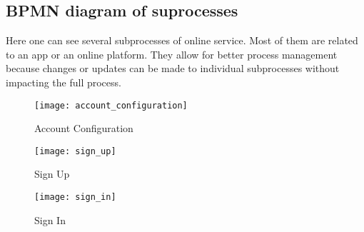 \newpage
\subsection{BPMN diagram of suprocesses}

Here one can see several subprocesses of online service.
Most of them are related to an app or an online platform.
They allow for better process management because changes or updates can be made to individual subprocesses without impacting the full process.

\begin{figure}[H]
	\centering
	\texttt{[image: account\_configuration]}
	\caption{Account Configuration}
	\label{fig:account_configuration}
\end{figure}

\begin{figure}[H]
	\centering
	\texttt{[image: sign\_up]}
	\caption{Sign Up}
	\label{fig:sign_up}
\end{figure}

\begin{figure}[ht!]
	\centering
	\texttt{[image: sign\_in]}
	\caption{Sign In}
	\label{fig:sign_in}
\end{figure}
